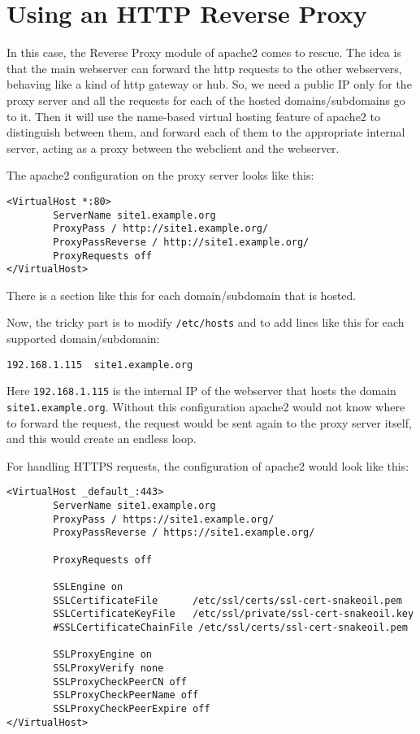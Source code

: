 \documentclass[a4paper]{article}
\begin{document}
\section{Using an HTTP Reverse Proxy}

In this case, the Reverse Proxy module of apache2 comes to rescue. The
idea is that the main webserver can forward the http requests to the
other webservers, behaving like a kind of http gateway or hub. So, we
need a public IP only for the proxy server and all the requests for
each of the hosted domains/subdomains go to it. Then it will use the
name-based virtual hosting feature of apache2 to distinguish between
them, and forward each of them to the appropriate internal server,
acting as a proxy between the webclient and the webserver.

The apache2 configuration on the proxy server looks like this:
\begin{verbatim}
<VirtualHost *:80>
        ServerName site1.example.org
        ProxyPass / http://site1.example.org/
        ProxyPassReverse / http://site1.example.org/
        ProxyRequests off
</VirtualHost>
\end{verbatim}
There is a section like this for each domain/subdomain that is hosted.

Now, the tricky part is to modify \verb~/etc/hosts~ and to add lines like this
for each supported domain/subdomain:
\begin{verbatim}
192.168.1.115  site1.example.org
\end{verbatim}

Here \verb=192.168.1.115= is the internal IP of the webserver that hosts
the domain \verb=site1.example.org=. Without this configuration apache2
would not know where to forward the request, the request would be
sent again to the proxy server itself, and this would create an
endless loop.

For handling HTTPS requests, the configuration of apache2 would look like this:
\begin{verbatim}
<VirtualHost _default_:443>
        ServerName site1.example.org
        ProxyPass / https://site1.example.org/
        ProxyPassReverse / https://site1.example.org/

        ProxyRequests off

        SSLEngine on
        SSLCertificateFile      /etc/ssl/certs/ssl-cert-snakeoil.pem
        SSLCertificateKeyFile   /etc/ssl/private/ssl-cert-snakeoil.key
        #SSLCertificateChainFile /etc/ssl/certs/ssl-cert-snakeoil.pem

        SSLProxyEngine on
        SSLProxyVerify none
        SSLProxyCheckPeerCN off
        SSLProxyCheckPeerName off
        SSLProxyCheckPeerExpire off
</VirtualHost>
\end{verbatim}
\end{document}
